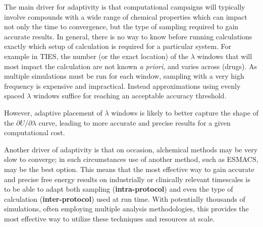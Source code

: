 The main driver for adaptivity is that computational campaigns will
typically involve compounds with a wide range of chemical properties which can
impact not only the time to convergence, but the type of sampling required to
gain accurate results. In general, there is no way to know before running
calculations exactly which setup of calculation is required for a particular
system. For example in TIES, the number (or the exact location) of the
$\lambda$ windows that will most impact the calculation are not known
\textit{a priori}, and varies across (drugs). As multiple simulations must be 
run for each window, sampling with a very high frequency is expensive and 
impractical. Instead approximations using evenly spaced $\lambda$ windows
suffice for reaching an acceptable accuracy threshold. 


However, adaptive placement of $\lambda$
windows is likely to better capture the shape of the 
$\partial U/\partial\lambda$ curve, leading to more accurate and precise 
results for a given computational cost.

Another driver of adaptivity is that on occasion, alchemical methods may be very 
slow to converge; in such circumstances use of another method, such as ESMACS,
may be the best option. This means that the most effective way to gain accurate 
and precise free energy results on industrially or clinically relevant 
timescales is to be able to adapt both sampling (\textbf{intra-protocol}) and 
even the type of calculation (\textbf{inter-protocol}) used at run time. With 
potentially thousands of simulations, often employing multiple analysis 
methodologies, this provides the most effective way to utilize these techniques 
and resources at scale.



